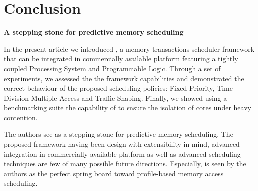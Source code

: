 \section{Conclusion}
    \par{\bf A stepping stone for predictive memory scheduling}
    
    In the present article we introduced \schim, a memory transactions scheduler framework that can be integrated in commercially available platform featuring a tightly coupled Processing System and Programmable Logic. Through a set of experiments, we assessed the the framework capabilities and demonstrated the correct behaviour of the proposed scheduling policies: Fixed Priority, Time Division Multiple Access and Traffic Shaping. Finally, we showed using a benchmarking suite the capability of \schim to ensure the isolation of cores under heavy contention.
    
    The authors see \schim as a stepping stone for predictive memory scheduling. The proposed framework having been design with extensibility in mind, advanced integration in commercially available platform as well as advanced scheduling techniques are few of many possible future directions. Especially, \schim is seen by the authors as the perfect spring board toward profile-based memory access scheduling.
